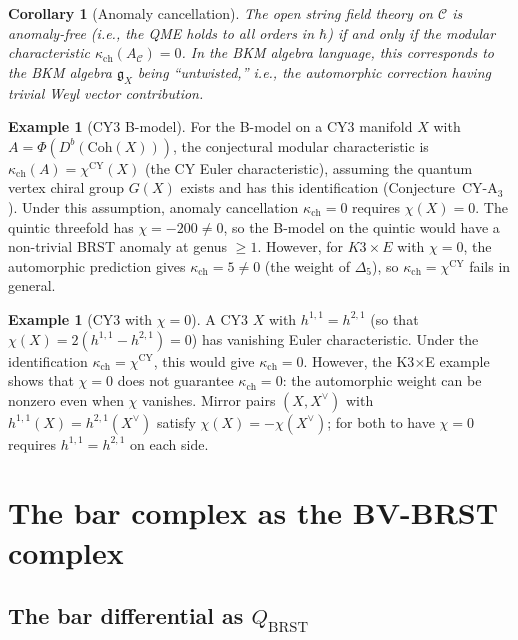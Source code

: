 \documentclass[11pt]{amsart}
\theoremstyle{plain}
\newtheorem{corollary}[theorem]{Corollary}
\theoremstyle{definition}
\newtheorem{example}[theorem]{Example}
\theoremstyle{remark}
\newcommand{\Coh}{\mathrm{Coh}}
\newcommand{\CY}{\mathrm{CY}}
\newcommand{\BRST}{\mathrm{BRST}}
\newcommand{\cC}{\mathcal{C}}
\begin{document}
\begin{corollary}[Anomaly cancellation]
\label{cor:anomaly-cancellation}
The open string field theory on $\cC$ is anomaly-free (i.e., the QME holds to all orders in $\hbar$) if and only if the modular characteristic $\kappa_{\mathrm{ch}}(A_\cC) = 0$. In the BKM algebra language, this corresponds to the BKM algebra $\mathfrak{g}_X$ being ``untwisted,'' i.e., the automorphic correction having trivial Weyl vector contribution.
\end{corollary}

\begin{example}[CY3 B-model]
For the B-model on a CY3 manifold $X$ with $A = \Phi(D^b(\Coh(X)))$, the conjectural modular characteristic is $\kappa_{\mathrm{ch}}(A) = \chi^{\CY}(X)$ (the CY Euler characteristic), assuming the quantum vertex chiral group $G(X)$ exists and has this identification (Conjecture~CY-A$_3$). Under this assumption, anomaly cancellation $\kappa_{\mathrm{ch}} = 0$ requires $\chi(X) = 0$. The quintic threefold has $\chi = -200 \neq 0$, so the B-model on the quintic would have a non-trivial BRST anomaly at genus $\geq 1$. However, for $K3 \times E$ with $\chi = 0$, the automorphic prediction gives $\kappa_{\mathrm{ch}} = 5 \neq 0$ (the weight of $\Delta_5$), so $\kappa_{\mathrm{ch}} = \chi^{\CY}$ fails in general.
\end{example}

\begin{example}[CY3 with $\chi = 0$]
A CY3 $X$ with $h^{1,1} = h^{2,1}$ (so that $\chi(X) = 2(h^{1,1} - h^{2,1}) = 0$) has vanishing Euler characteristic. Under the identification $\kappa_{\mathrm{ch}} = \chi^{\CY}$, this would give $\kappa_{\mathrm{ch}} = 0$. However, the K3$\times$E example shows that $\chi = 0$ does not guarantee $\kappa_{\mathrm{ch}} = 0$: the automorphic weight can be nonzero even when $\chi$ vanishes. Mirror pairs $(X, X^\vee)$ with $h^{1,1}(X) = h^{2,1}(X^\vee)$ satisfy $\chi(X) = -\chi(X^\vee)$; for both to have $\chi = 0$ requires $h^{1,1} = h^{2,1}$ on each side.
\end{example}

\section{The bar complex as the BV-BRST complex}
\label{sec:bar-brst}

\subsection{The bar differential as $Q_{\BRST}$}
\label{subsec:bar-diff-brst}
\end{document}
